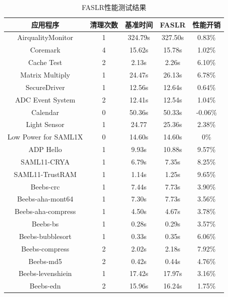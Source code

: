 \documentclass[UTF8,12pt,a4paper,twoside]{ctexart}
\numberwithin{figure}{section}
\begin{document}
\begin{longtable}{ccccc}
    \caption{FASLR性能测试结果}  %
    \label{table1}                                            \\ %
    \hline
    应用程序                 & 清理次数 & 基准时间    & FASLR   & 性能开销    \\ \hline
    AirqualityMonitor    & 1    & 324.79s & 327.50s & 0.83\%  \\ 
    Coremark             & 4    & 15.62s  & 15.78s  & 1.02\%  \\ 
    Cache Test           & 2    & 2.13s   & 2.26s   & 6.10\%  \\ 
    Matrix Multiply      & 1    & 24.47s  & 26.13s  & 6.78\%  \\ 
    SecureDriver         & 1    & 12.56s  & 12.64s  & 0.64\%  \\ 
    ADC Event System     & 2    & 12.41s  & 12.54s  & 1.04\%  \\ 
    Calendar             & 0    & 50.36s  & 50.33s  & -0.06\% \\ 
    Light Sensor         & 1    & 24.77   & 25.36s  & 2.38\%  \\ 
    Low Power for SAML1X & 0    & 14.60s  & 14.60s  & 0\%     \\ 
    ADP Hello            & 1    & 9.93s   & 10.88s  & 9.57\%  \\ 
    SAML11-CRYA          & 1    & 6.79s   & 7.35s   & 8.25\%  \\ 
    SAML11-TrustRAM      & 1    & 1.14s   & 1.25s   & 9.65\%  \\ 
    Beebs-crc            & 1    & 7.44s   & 7.73s   & 3.90\%  \\ 
    Beebs-aha-mont64     & 1    & 7.30s   & 7.73s   & 3.56\%  \\ 
    Beebs-aha-compress   & 1    & 4.50s   & 4.67s   & 3.78\%  \\ 
    Beebs-bs             & 1    & 0.28s   & 0.29s   & 3.57\%  \\ 
    Beebs-bubblesort     & 1    & 0.33s   & 0.35s   & 6.06\%  \\ 
    Beebs-compress       & 2    & 2.02s   & 2.18s   & 7.92\%  \\ 
    Beebs-md5            & 2    & 0.42s   & 0.44s   & 4.76\%  \\ 
    Beebs-levenshiein    & 1    & 17.42s  & 17.97s  & 3.16\%  \\ 
    Beebs-edn            & 2    & 15.96s  & 16.24s  & 1.75\%  \\ \hline
\end{longtable}
\end{document}
